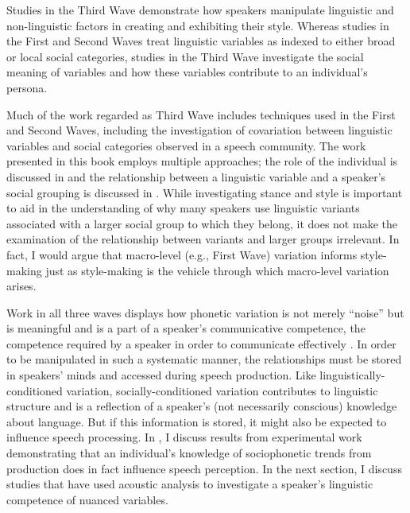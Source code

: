 Studies in the Third Wave demonstrate how speakers manipulate linguistic and non-linguistic factors in creating and exhibiting their style. Whereas studies in the First and Second Waves treat linguistic variables as indexed to either broad or local social categories, studies in the Third Wave investigate the social meaning of variables and how these variables contribute to an individual's persona. 

Much of the work regarded as Third Wave includes techniques used in the First and Second Waves, including the investigation of covariation between linguistic variables and social categories observed in a speech community. The work presented in this book employs multiple approaches; the role of the individual is discussed in  and the relationship between a linguistic variable and a speaker's social grouping is discussed in . While investigating stance and style is important to aid in the understanding of why many speakers use linguistic variants associated with a larger social group to which they belong, it does not make the examination of the relationship between variants and larger groups irrelevant. In fact, I would argue that macro-level (e.g., First Wave) variation informs style-making just as style-making is the vehicle through which macro-level variation arises.


  



Work in all three waves displays how phonetic variation is not merely ``noise'' but is meaningful and is a part of a speaker's communicative competence, the competence required by a speaker in order to communicate effectively \citep{hymes1972}. In order to be manipulated in such a systematic manner, the relationships must be stored in speakers' minds and accessed during speech production. Like linguistically-conditioned variation, socially-conditioned variation contributes to linguistic structure and is a reflection of a speaker's (not necessarily conscious) knowledge about language. But if this information is stored, it might also be expected to influence speech processing. In , I discuss results from experimental work demonstrating that an individual's knowledge of sociophonetic trends from production does in fact influence speech perception. In the next section, I discuss studies that have used acoustic analysis to investigate a speaker's linguistic competence of nuanced variables.


